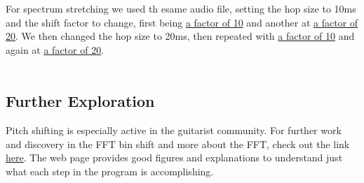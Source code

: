For spectrum stretching we used th esame audio file, setting the hop size to 10ms and the shift factor to change, first being
\href{run:../OutputAudio/Streatch_22-001 Original Vocal_{N=10ms}{h=0.25}{s=10}.wav}{a factor of 10}
and another at
\href{run:../OutputAudio/Streatch_22-001 Original Vocal_{N=10ms}{h=0.25}{s=20}.wav}{a factor of 20}.
We then changed the hop size to 20ms, then repeated with 
\href{run:../OutputAudio/Streatch_22-001 Original Vocal_{N=20ms}{h=0.25}{s=10}.wav}{a factor of 10}
and again at
\href{run:../OutputAudio/Streatch_22-001 Original Vocal_{N=20ms}{h=0.25}{s=20}.wav}{a factor of 20}.
\\ \\


\subsection{Further Exploration}
Pitch shifting is especially active in the guitarist community. For further work and discovery in the FFT bin shift and more about the FFT, check out the link 
\href{http://www.guitarpitchshifter.com/algorithm.html}{here}. 
The web page provides good figures and explanations to understand just what each step in the program is accomplishing.
